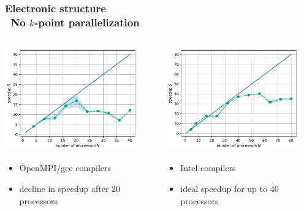 \documentclass[aspectratio=169]{beamer}
\begin{document}

\begin{frame}
	\frametitle{Electronic structure\\ No \(k\)-point parallelization}
	
	\begin{columns}
		\begin{column}{0.5\textwidth}
			\includegraphics[width=0.9\textwidth]{figs/TaS2_ompi_bench_nprocs_speedup.pdf}
			\begin{itemize}
				\item OpenMPI/gcc compilers
				\item decline in speedup after 20 processors
			\end{itemize}
		\end{column}

		\begin{column}{0.5\textwidth}
				\includegraphics[width=0.9\textwidth]{figs/TaS2_intel_bench_nprocs_speedup.pdf}
			\begin{itemize}
				\item Intel compilers
				\item ideal speedup for up to 40 processors
			\end{itemize}
		\end{column}
	\end{columns}
\end{frame}
\end{document}
